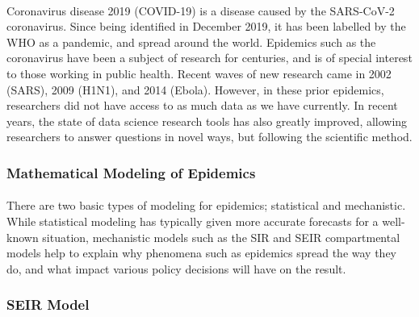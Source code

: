 \documentclass[12pt, a4, epsf] {article}
\theoremstyle{plain}
\theoremstyle{definition}
\begin{document}
\paragraph{}
Coronavirus disease 2019 (COVID-19) is a disease caused by the SARS-CoV-2 coronavirus. Since being identified in December 2019, it has been labelled by the WHO as a pandemic, and spread around the world. Epidemics such as the coronavirus have been a subject of research for centuries, and is of special interest to those working in public health. Recent waves of new research came in 2002 (SARS), 2009 (H1N1), and 2014 (Ebola). However, in these prior epidemics, researchers did not have access to as much data as we have currently. In recent years, the state of data science research tools has also greatly improved, allowing researchers to answer questions in novel ways, but following the scientific method.

\subsubsection{Mathematical Modeling of Epidemics}
\paragraph{}
There are two basic types of modeling for epidemics; statistical and mechanistic. While statistical modeling has typically given more accurate forecasts for a well-known situation, mechanistic models such as the SIR and SEIR compartmental models help to explain why phenomena such as epidemics spread the way they do, and what impact various policy decisions will have on the result.
\subsubsection{SEIR Model}
\end{document}
